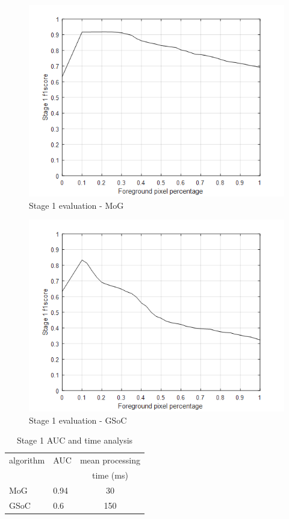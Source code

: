 \begin{figure}
    \centering
    \includegraphics[width=\linewidth]{images/f1-analysis-mog.png}
    \caption{Stage 1 evaluation - MoG}
    \label{fig:f1-analysis-mog}
\end{figure}

\begin{figure}
    \centering
    \includegraphics[width=\linewidth]{images/f1-analysis-gsoc.png}
    \caption{Stage 1 evaluation - GSoC}
    \label{fig:f1-analysis-gsoc}
\end{figure}

\begin{table}
\centering
\label{table:auc-time-analysis-s1}
\caption{Stage 1 AUC and time analysis} \vspace{5pt}
\begin{tabular}{|l|l|c|}
\hline
algorithm   & AUC     & mean processing \\
            &         &  time (ms)  \\ \hline \hline
MoG         & 0.94    & 30    \\
GSoC        & 0.6     & 150  \\ \hline
\end{tabular}
\end{table}

